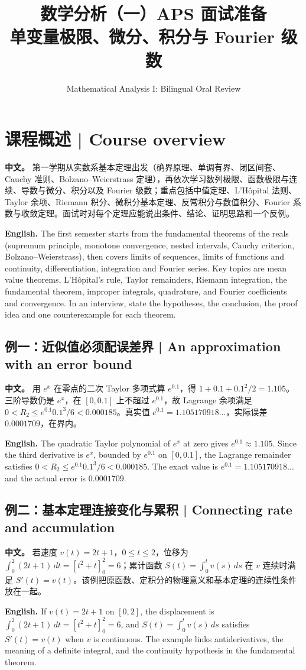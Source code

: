 \documentclass[UTF8,11pt,a4paper]{ctexart}
\title{数学分析（一）APS 面试准备\\[4pt]\large 单变量极限、微分、积分与 Fourier 级数}
\author{Mathematical Analysis I: Bilingual Oral Review}
\date{}
\newcommand{\APS}[2]{\par\noindent\textbf{中文。} #1\par\noindent\textbf{English.} #2\par\smallskip}
\begin{document}
\maketitle

\section*{课程概述 | Course overview}
\APS{第一学期从实数系基本定理出发（确界原理、单调有界、闭区间套、Cauchy 准则、Bolzano--Weierstrass 定理），再依次学习数列极限、函数极限与连续、导数与微分、积分以及 Fourier 级数；重点包括中值定理、L'H\^opital 法则、Taylor 余项、Riemann 积分、微积分基本定理、反常积分与数值积分、Fourier 系数与收敛定理。面试时对每个定理应能说出条件、结论、证明思路和一个反例。}{The first semester starts from the fundamental theorems of the reals (supremum principle, monotone convergence, nested intervals, Cauchy criterion, Bolzano--Weierstrass), then covers limits of sequences, limits of functions and continuity, differentiation, integration and Fourier series. Key topics are mean value theorems, L'H\^opital's rule, Taylor remainders, Riemann integration, the fundamental theorem, improper integrals, quadrature, and Fourier coefficients and convergence. In an interview, state the hypotheses, the conclusion, the proof idea and one counterexample for each theorem.}
\subsection*{例一：近似值必须配误差界 | An approximation with an error bound}
\APS{用 $e^x$ 在零点的二次 Taylor 多项式算 $e^{0.1}$，得 $1+0.1+0.1^2/2=1.105$。三阶导数仍是 $e^x$，在 $[0,0.1]$ 上不超过 $e^{0.1}$，故 Lagrange 余项满足 $0<R_2\le e^{0.1}0.1^3/6<0.000185$。真实值 $e^{0.1}=1.105170918\ldots$，实际误差 $0.0001709$，在界内。}{The quadratic Taylor polynomial of $e^x$ at zero gives $e^{0.1}\approx1.105$. Since the third derivative is $e^x$, bounded by $e^{0.1}$ on $[0,0.1]$, the Lagrange remainder satisfies $0<R_2\le e^{0.1}0.1^3/6<0.000185$. The exact value is $e^{0.1}=1.105170918\ldots$ and the actual error is $0.0001709$.}
\subsection*{例二：基本定理连接变化与累积 | Connecting rate and accumulation}
\APS{若速度 $v(t)=2t+1$，$0\le t\le2$，位移为 $\int_0^2(2t+1)\,dt=[t^2+t]_0^2=6$；累计函数 $S(t)=\int_0^t v(s)\,ds$ 在 $v$ 连续时满足 $S'(t)=v(t)$。该例把原函数、定积分的物理意义和基本定理的连续性条件放在一起。}{If $v(t)=2t+1$ on $[0,2]$, the displacement is $\int_0^2(2t+1)\,dt=[t^2+t]_0^2=6$, and $S(t)=\int_0^t v(s)\,ds$ satisfies $S'(t)=v(t)$ when $v$ is continuous. The example links antiderivatives, the meaning of a definite integral, and the continuity hypothesis in the fundamental theorem.}
\end{document}
